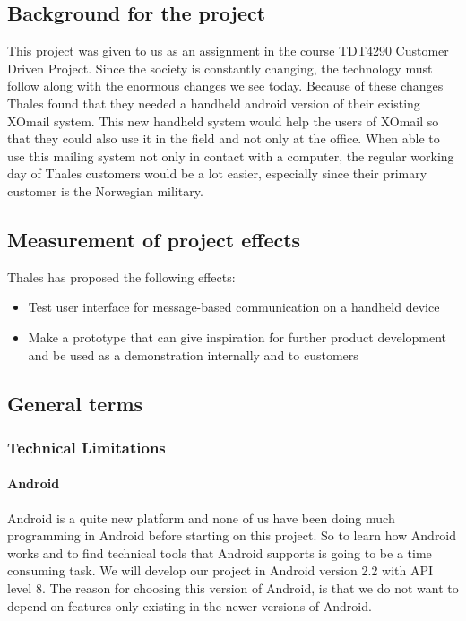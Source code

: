 \subsection{Background for the project}

This project was given to us as an assignment in the course TDT4290 Customer Driven Project. Since the society is constantly changing, the technology must follow along with the enormous changes we see today. Because of these changes Thales found that they needed a handheld android version of their existing XOmail system. This new handheld system would help the users of XOmail so that they could also use it in the field and not only at the office. When able to use this mailing system not only in contact with a computer, the regular working day of Thales customers would be a lot easier, especially since their primary customer is the Norwegian military.

\subsection{Measurement of project effects}

Thales has proposed the following effects:
\begin{itemize}
\item{}Test user interface for message-based communication on a handheld device
\item{}Make a prototype that can give inspiration for further product development and be used as a demonstration internally and to customers
\end{itemize}

\newpage
\subsection{General terms}

\subsubsection{Technical Limitations}

\paragraph{Android}
Android is a quite new platform and none of us have been doing much programming in Android before starting on this project. So to learn how Android works and to find technical tools that Android supports is going to be a time consuming task. We will develop our project in Android version 2.2 with API level 8. The reason for choosing this version of Android, is that we do not want to depend on features only existing in the newer versions of Android. 

